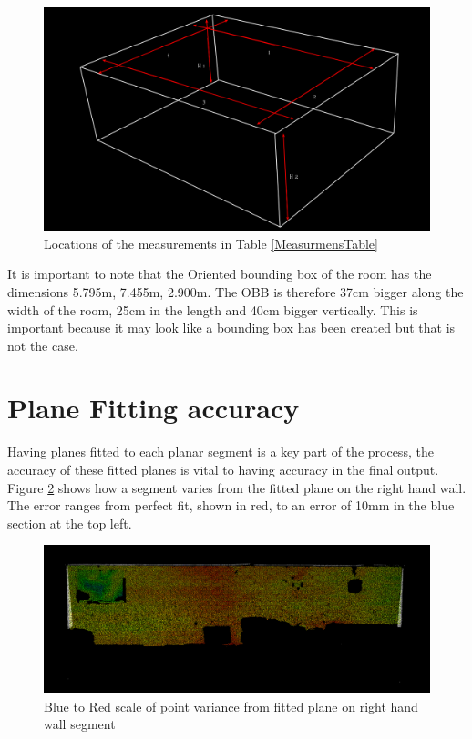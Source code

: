		
		\begin{figure}[H]
			\centering
			\includegraphics[width=0.7\linewidth]{Includes/images/Results/Selection_013}
			\caption{Locations of the measurements in Table \ref{MeasurmensTable}}
			\label{fig:SourceOfMEasure}
		\end{figure}
		
		\noindent It is important to note that the Oriented bounding box of the room has the dimensions 5.795m, 7.455m, 2.900m. The OBB is therefore 37cm bigger along the width of the room, 25cm in the length and 40cm bigger vertically. This is important because it may look like a bounding box has been created but that is not the case.
		
	\section{Plane Fitting accuracy}
		Having planes fitted to each planar segment is a key part of the process, the accuracy of these fitted planes is vital to having accuracy in the final output. Figure \ref{fig:Planefitingaccuracy} shows how a segment varies from the fitted plane on the right hand wall. The error ranges from perfect fit, shown in red, to an error of 10mm in the blue section at the top left.
		
		\begin{figure}[H]
		\centering
		\includegraphics[width=1\linewidth]{"Includes/images/Results/Plane fiting accuracy"}
		\caption{Blue to Red scale of point variance from fitted plane on right hand wall segment }
		\label{fig:Planefitingaccuracy}
		\end{figure}
	

